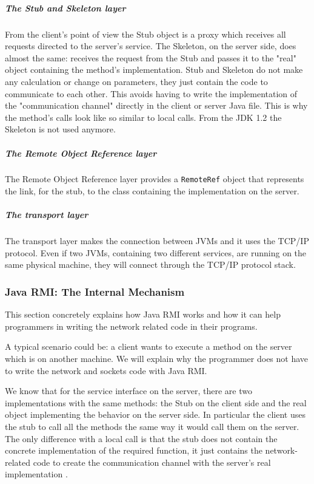 \subparagraph{The Stub and Skeleton layer}
From the client's point of view the Stub object is a proxy which receives all requests directed to the server's service. The Skeleton, on the server side, does almost the same: receives the request from the Stub and passes it to the "real" object containing the method's implementation. Stub and Skeleton do not make any calculation or change on parameters, they just contain the code to communicate to each other. This avoids having to write the implementation of the "communication channel" directly in the client or server Java file. This is why the method's calls look like so similar to local calls. From the JDK 1.2 the Skeleton is not used anymore.
\subparagraph{The Remote Object Reference layer}
The Remote Object Reference layer provides a \verb|RemoteRef| object that represents the link, for the stub, to the class containing the implementation on the server. 
\subparagraph{The transport layer}
The transport layer makes the connection between JVMs and it uses the TCP/IP protocol. Even if two JVMs, containing two different services, are running on the same physical machine, they will connect through the TCP/IP protocol stack. 


\subsubsection{Java RMI: The Internal Mechanism}
\label{JavaRMIinternalMechanism}

This section concretely explains how Java RMI works and how it can help programmers in writing the network related code in their programs.

A typical scenario could be: a client wants to execute a method on the server which is on another machine. We will explain why the programmer does not have to write the network and sockets code with Java RMI.

We know that for the service interface on the server, there are two implementations with the same methods: the Stub on the client side and the real object implementing the behavior on the server side. In particular the client uses the stub to call all the methods the same way it would call them on the server. The only difference with a local call is that the stub does not contain the concrete implementation of the required function, it just contains the network-related code to create the communication channel with the server's real implementation \cite{RMI-art4}.

